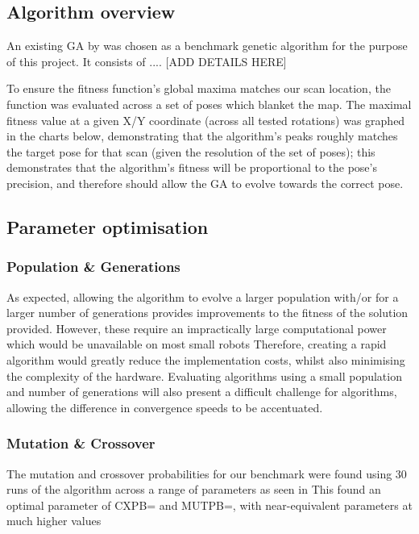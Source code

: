 \documentclass[authoryearcitations]{UoYCSproject}
\begin{document}
\subsection{Algorithm overview}
An existing GA by 
was chosen as a benchmark genetic algorithm for the purpose of this project. It consists of .... [ADD DETAILS HERE]

To ensure the fitness function's global maxima matches our scan location, the function was evaluated across a set of poses which blanket the map. The maximal fitness value at a given X/Y coordinate (across all tested rotations) was graphed in the charts below, demonstrating that the algorithm's peaks roughly matches the target pose for that scan (given the resolution of the set of poses); this demonstrates that the algorithm's fitness will be proportional to the pose's precision, and therefore should allow the GA to evolve towards the correct pose.

\subsection{Parameter optimisation}
\subsubsection{Population \& Generations}
As expected, allowing the algorithm to evolve a larger population with/or for a larger number of generations provides improvements to the fitness of the solution provided.
  However, these require an impractically large computational power 
which would be unavailable on most small robots 
Therefore, creating a rapid algorithm would greatly reduce the implementation costs, whilst also minimising the complexity of the hardware. Evaluating algorithms using a small population and number of generations will also present a difficult challenge for algorithms, allowing the difference in convergence speeds to be accentuated. 

\subsubsection{Mutation \& Crossover}
The mutation and crossover probabilities for our benchmark were found using 30 runs of the algorithm across a range of parameters as seen in 
 This found an optimal parameter of CXPB= and MUTPB=, with near-equivalent parameters at much higher values 
\end{document}
